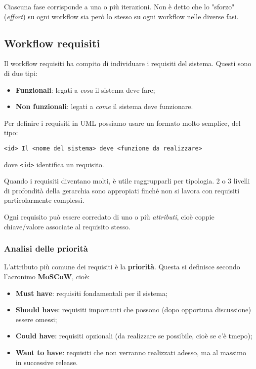 \documentclass[a4paper,11pt]{article}
\begin{document}
Ciascuna fase corrisponde a una o più iterazioni. Non è detto che lo "sforzo" (\textit{effort}) su ogni workflow sia però lo stesso su ogni workflow nelle diverse fasi.

\subsection{Workflow requisiti}
Il workflow requisiti ha compito di individuare i requisiti del sistema.
Questi sono di due tipi:
\begin{itemize}
	\item \textbf{Funzionali}: legati a \textit{cosa} il sistema deve fare;
	\item \textbf{Non funzionali}: legati a \textit{come} il sistema deve funzionare.
\end{itemize}

Per definire i requisiti in UML possiamo usare un formato molto semplice, del tipo:
\begin{lstlisting}[style=codestyle]	
<id> Il <nome del sistema> deve <funzione da realizzare>
\end{lstlisting}
dove \lstinline|<id>| identifica un requisito.

Quando i requisiti diventano molti, è utile raggrupparli per tipologia. 2 o 3 livelli di profondità della gerarchia sono appropiati finché non si lavora con requisiti particolarmente complessi.

Ogni requisito può essere corredato di uno o più \textit{attributi}, cioè coppie chiave/valore associate al requisito stesso.

\subsubsection{Analisi delle priorità}
L'attributo più comune dei requisiti è la \textbf{priorità}. Questa si definisce secondo l'acronimo \textbf{MoSCoW}, cioè:
\begin{itemize}
	\item \textbf{Must have}: requisiti fondamentali per il sistema;
	\item \textbf{Should have}: requisiti importanti che possono (dopo opportuna discussione) essere omessi;
	\item \textbf{Could have}: requisiti opzionali (da realizzare se possibile, cioè se c'è tmepo);
	\item \textbf{Want to have}: requisiti che non verranno realizzati adesso, ma al massimo in successive release.
\end{itemize}
\end{document}
